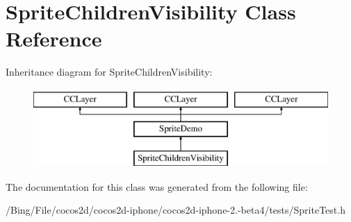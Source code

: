 \hypertarget{interface_sprite_children_visibility}{\section{Sprite\-Children\-Visibility Class Reference}
\label{interface_sprite_children_visibility}
}
Inheritance diagram for Sprite\-Children\-Visibility\-:\begin{figure}[H]
\begin{center}
\leavevmode
\includegraphics[height=3.000000cm]{interface_sprite_children_visibility}
\end{center}
\end{figure}


The documentation for this class was generated from the following file\-:\begin{DoxyCompactItemize}
\item 
/\-Bing/\-File/cocos2d/cocos2d-\/iphone/cocos2d-\/iphone-\/2.-\/beta4/tests/Sprite\-Test.\-h\end{DoxyCompactItemize}
